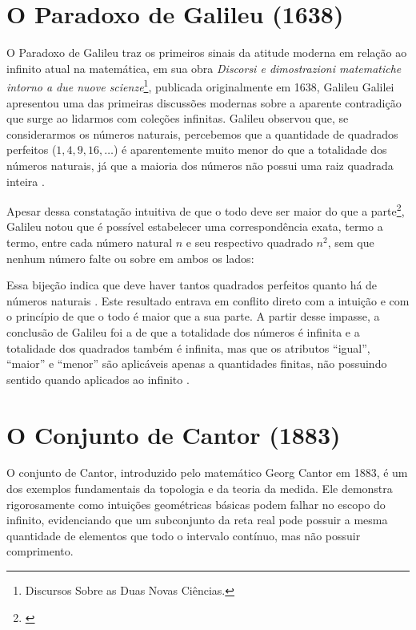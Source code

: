 \section{O Paradoxo de Galileu (1638)}
\label{sec:paradoxo_galileu}

O Paradoxo de Galileu traz os primeiros sinais da atitude moderna em relação ao infinito atual na matemática, em sua obra \textit{Discorsi e dimostrazioni matematiche intorno a due nuove scienze}\footnote{Discursos Sobre as Duas Novas Ciências.}, publicada originalmente em 1638, Galileu Galilei apresentou uma das primeiras discussões modernas sobre a aparente contradição que surge ao lidarmos com coleções infinitas. Galileu observou que, se considerarmos os números naturais, percebemos que a quantidade de quadrados perfeitos (\(1, 4, 9, 16, \dots\)) é aparentemente muito menor do que a totalidade dos números naturais, já que a maioria dos números não possui uma raiz quadrada inteira \parencite[p.~31]{galilei1914}.

Apesar dessa constatação intuitiva de que o todo deve ser maior do que a parte\footnote{\textcite[p.~99]{euclides2009}}, Galileu notou que é possível estabelecer uma correspondência exata, termo a termo, entre cada número natural \(n\) e seu respectivo quadrado \(n^2\), sem que nenhum número falte ou sobre em ambos os lados:



Essa bijeção indica que deve haver tantos quadrados perfeitos quanto há de números naturais \parencite[p.~5]{rucker2019}. Este resultado entrava em conflito direto com a intuição e com o princípio de que o todo é maior que a sua parte. A partir desse impasse, a conclusão de Galileu foi a de que a totalidade dos números é infinita e a totalidade dos quadrados também é infinita, mas que os atributos ``igual'', ``maior'' e ``menor'' são aplicáveis apenas a quantidades finitas, não possuindo sentido quando aplicados ao infinito \parencite[p.~32]{galilei1914}.

\section{O Conjunto de Cantor (1883)}

O conjunto de Cantor, introduzido pelo matemático Georg Cantor em 1883, é um dos exemplos fundamentais da topologia e da teoria da medida. Ele demonstra rigorosamente como intuições geométricas básicas podem falhar no escopo do infinito, evidenciando que um subconjunto da reta real pode possuir a mesma quantidade de elementos que todo o intervalo contínuo, mas não possuir comprimento.

